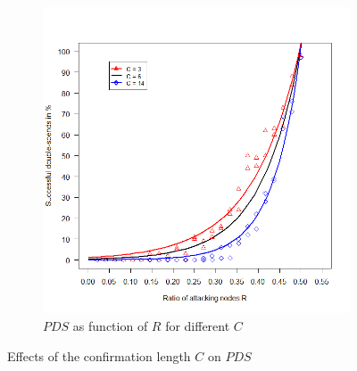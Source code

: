 \documentclass[a4paper,12pt,twoside]{report}
\begin{document}
\begin{figure}
\begin{subfigure}{.5\textwidth}
  \includegraphics[width=\linewidth]{Experiments/Confirmations/confrat.png}
  \caption{$PDS$ as function of $R$ for different $C$}
  \label{conf:b}
\end{subfigure}
\caption{Effects of the confirmation length $C$ on $PDS$}
\label{conf}
\end{figure}
\end{document}
